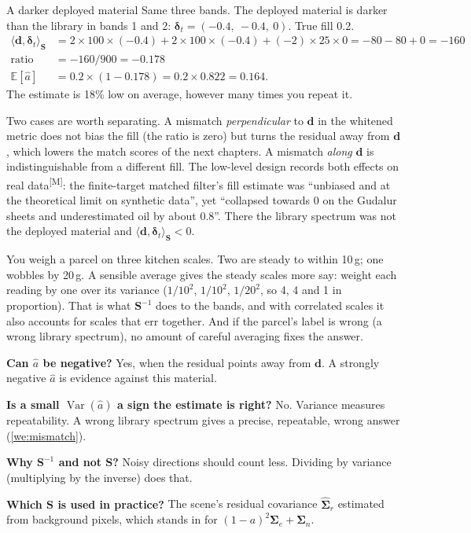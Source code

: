\documentclass[11pt,a4paper,oneside,openany]{book}
\newcommand{\B}[1]{{\symbf{#1}}}
\newcommand{\B}[1]{{\bm{#1}}}
\newcommand{\meas}{\textsuperscript{\textsf{\scriptsize[M]}}}
\newcommand{\E}{\mathbb{E}}
\newcommand{\Var}{\operatorname{Var}}
\newcommand{\vd}{\B{d}}
\newcommand{\vdelta}{\B{\delta}}
\newcommand{\mS}{\B{S}}
\newcommand{\mSig}{\B{\Sigma}}
\newcommand{\ahat}{\hat a}
\begin{document}
\begin{worked}[label=we:mismatch]{A darker deployed material}
Same three bands. The deployed material is darker than the library in bands 1 and 2: $\vdelta_t=(-0.4,\ -0.4,\ 0)$. True fill 0.2.
\begin{align*}
\langle\vd,\vdelta_t\rangle_{\mS} &= 2\times100\times(-0.4)+2\times100\times(-0.4)+(-2)\times25\times0=-80-80+0=-160\\
\text{ratio} &= -160/900=-0.178\\
\E[\ahat] &= 0.2\times(1-0.178)=0.2\times0.822=0.164 .
\end{align*}
The estimate is 18\% low on average, however many times you repeat it.
\end{worked}

Two cases are worth separating. A mismatch \emph{perpendicular} to $\vd$ in the whitened metric does not bias the fill (the ratio is zero) but
turns the residual away from $\vd$, which lowers the match scores of the next chapters. A mismatch \emph{along} $\vd$ is indistinguishable
from a different fill. The low-level design records both effects on real data\meas: the finite-target matched filter's fill estimate was
``unbiased and at the theoretical limit on synthetic data'', yet ``collapsed towards 0 on the Gudalur sheets and underestimated oil by about
0.8''. There the library spectrum was not the deployed material and $\langle\vd,\vdelta_t\rangle_{\mS}<0$.

\begin{analogy}
You weigh a parcel on three kitchen scales. Two are steady to within 10\,g; one wobbles by 20\,g. A sensible average gives the steady scales
more say: weight each reading by one over its variance ($1/10^2$, $1/10^2$, $1/20^2$, so 4, 4 and 1 in proportion). That is what $\mS^{-1}$
does to the bands, and with correlated scales it also accounts for scales that err together. And if the parcel's label is wrong (a wrong
library spectrum), no amount of careful averaging fixes the answer.
\end{analogy}

\begin{confusions}
\textbf{Can $\ahat$ be negative?} Yes, when the residual points away from $\vd$. A strongly negative $\ahat$ is evidence against this material.

\textbf{Is a small $\Var(\ahat)$ a sign the estimate is right?} No. Variance measures repeatability. A wrong library spectrum gives a
precise, repeatable, wrong answer (\cref{we:mismatch}).

\textbf{Why $\mS^{-1}$ and not $\mS$?} Noisy directions should count less. Dividing by variance (multiplying by the inverse) does that.

\textbf{Which $\mS$ is used in practice?} The scene's residual covariance $\hat{\mSig}_r$ estimated from background pixels, which stands in for
$(1-a)^2\mSig_e+\mSig_n$.
\end{confusions}
\end{document}
